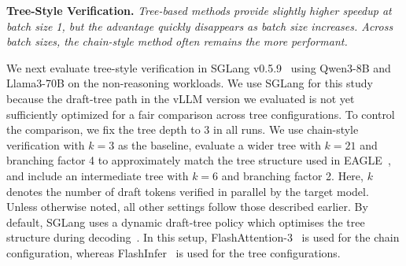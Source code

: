 \documentclass{article}
\begin{document}
\begin{quoting}[leftmargin=1.5em, rightmargin=1.5em, vskip=0pt]
\textbf{Tree-Style Verification.}
\emph{Tree-based methods provide slightly higher speedup at batch size 1, but the advantage quickly disappears as batch size increases. Across batch sizes, the chain-style method often remains the more performant.}
\end{quoting}


We next evaluate tree-style verification in SGLang v0.5.9~\cite{zheng2024sglang} using Qwen3-8B and Llama3-70B on the non-reasoning workloads. We use SGLang for this study because the draft-tree path in the vLLM version we evaluated is not yet sufficiently optimized for a fair comparison across tree configurations. To control the comparison, we fix the tree depth to 3 in all runs. We use chain-style verification with $k{=}3$ as the baseline, evaluate a wider tree with $k{=}21$ and branching factor 4 to approximately match the tree structure used in EAGLE~\cite{li2024eagle}, and include an intermediate tree with $k{=}6$ and branching factor 2. Here, $k$ denotes the number of draft tokens verified in parallel by the target model. Unless otherwise noted, all other settings follow those described earlier. By default, SGLang uses a dynamic draft-tree policy which optimises the tree structure during decoding~\cite{li2024eagle}. In this setup, FlashAttention-3~\cite{shah2024flashattention} is used for the chain configuration, whereas FlashInfer~\cite{ye2025flashinfer} is used for the tree configurations.
\end{document}
